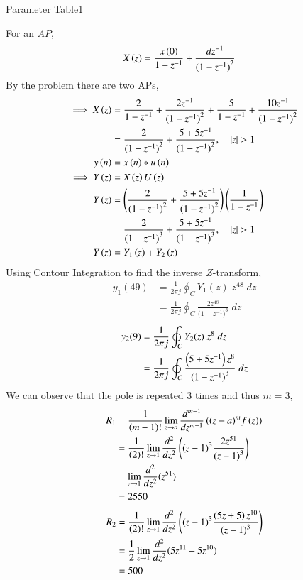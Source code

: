 \documentclass[journal,12pt,twocolumn]{IEEEtran}
\begin{document}
	\begin{table}[ht]
		\centering
		\def\arraystretch{1.5}
		
		\caption{Parameter Table1}
		\label{tab:10.5.3.1}
	\end{table}
	For an $AP$,
	\begin{align}
		X\left(z\right) &= \frac{ x\left(0\right) }{1-z^{-1}} + \frac{dz^{-1}}{{(1-z^{-1})}^{2}} 
    \end{align}
    By the problem there are two APs,
    \begin{align}
		\implies X\left(z\right) &= \frac{2}{1-z^{-1}} + \frac{2z^{-1}}{{(1-z^{-1})}^{2}}
		+ \frac{5}{1-z^{-1}} + \frac{10z^{-1}}{{(1-z^{-1})}^{2}} \\
		&= \frac{2}{({1-z^{-1})}^{2}} + \frac{5+5z^{-1}}{({1-z^{-1})}^{2}}, \quad \left\vert z\right\vert>1 \\
		y\left(n\right)&=x\left(n\right)\ast u\left(n\right) \\
		\implies Y\left(z\right)&=X\left(z\right)U\left(z\right) \\
		Y\left(z\right)&=\left(\frac{2}{({1-z^{-1})}^{2}} + \frac{5+5z^{-1}}{({1-z^{-1})}^{2}}\right)\left(\frac{1}{1-z^{-1}}\right)\\
		&= \frac{2}{({1-z^{-1})}^{3}} + \frac{5+5z^{-1}}{({1-z^{-1})}^{3}},  \quad \left\vert z\right\vert>1\\
		Y\left(z\right)&= Y_1\left(z\right) + Y_2\left(z\right) 
	\end{align}
	Using Contour Integration to find the inverse $Z$-transform,
	\begin{align}
		y_1(49)&=\frac{1}{2\pi j}\oint_{C}Y_1(z) \;z^{48} \;dz  \\
		&=\frac{1}{2\pi j}\oint_{C}\frac{2z^{48}}{({1-z^{-1})}^{3}} \;dz 
	\end{align}
	\begin{align}
		y_2(9)&=\frac{1}{2\pi j}\oint_{C}Y_2(z) \;z^{8} \;dz  \\
		&=\frac{1}{2\pi j}\oint_{C}\frac{\left(5+5z^{-1}\right)z^{8}}{({1-z^{-1})}^{3}} \;dz 
	\end{align}
	We can observe that the pole is repeated $3$ times and thus $m=3$,
	\begin{align}
		R_1&=\frac{1}{\left(m-1\right)!}\lim\limits_{z\to a}\frac{d^{m-1}}{dz^{m-1}}\left({(z-a)}^{m}f\left(z\right)\right)  \\
		&=\frac{1}{\left(2\right)!}\lim\limits_{z\to 1}\frac{d^{2}}{dz^{2}}\left({(z-1)}^{3}\frac{2z^{51}}{{(z-1)}^3}\right)   \\
		&=\lim\limits_{z\to 1}\frac{d^2}{dz^2}(z^{51})   \\
		&=2550
	\end{align}
	\begin{align}
		R_2&=\frac{1}{\left(2\right)!}\lim\limits_{z\to 1}\frac{d^{2}}{dz^{2}}\left({(z-1)}^{3}\frac{\left(5z+5\right)z^{10}}{{(z-1)}^3}\right)   \\
		&=\frac{1}{{2}}\lim\limits_{z\to 1}\frac{d^2}{dz^2}(5z^{11}+5z^{10})   \\
		&=500
	\end{align}
\end{document}
